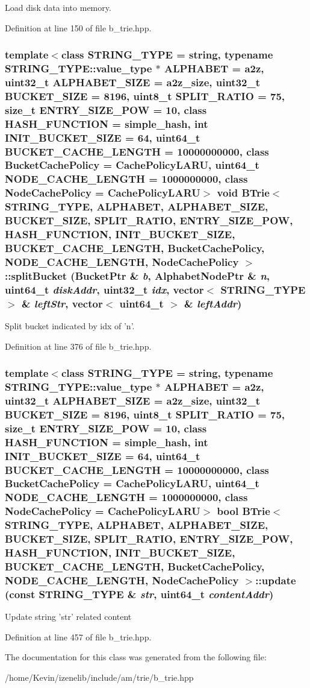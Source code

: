 Load disk data into memory. 

Definition at line 150 of file b\_\-trie.hpp.\hypertarget{classBTrie_3e3f5765235c78ab56663a0852c1178d}{
\subsubsection[{splitBucket}]{\setlength{\rightskip}{0pt plus 5cm}template$<$class STRING\_\-TYPE  = string, typename STRING\_\-TYPE::value\_\-type $\ast$ ALPHABET = a2z, uint32\_\-t ALPHABET\_\-SIZE = a2z\_\-size, uint32\_\-t BUCKET\_\-SIZE = 8196, uint8\_\-t SPLIT\_\-RATIO = 75, size\_\-t ENTRY\_\-SIZE\_\-POW = 10, class HASH\_\-FUNCTION  = simple\_\-hash, int INIT\_\-BUCKET\_\-SIZE = 64, uint64\_\-t BUCKET\_\-CACHE\_\-LENGTH = 10000000000, class BucketCachePolicy  = CachePolicyLARU, uint64\_\-t NODE\_\-CACHE\_\-LENGTH = 1000000000, class NodeCachePolicy  = CachePolicyLARU$>$ void {\bf BTrie}$<$ STRING\_\-TYPE, ALPHABET, ALPHABET\_\-SIZE, BUCKET\_\-SIZE, SPLIT\_\-RATIO, ENTRY\_\-SIZE\_\-POW, HASH\_\-FUNCTION, INIT\_\-BUCKET\_\-SIZE, BUCKET\_\-CACHE\_\-LENGTH, BucketCachePolicy, NODE\_\-CACHE\_\-LENGTH, NodeCachePolicy $>$::splitBucket (BucketPtr \& {\em b}, \/  AlphabetNodePtr \& {\em n}, \/  uint64\_\-t {\em diskAddr}, \/  uint32\_\-t {\em idx}, \/  vector$<$ STRING\_\-TYPE $>$ \& {\em leftStr}, \/  vector$<$ uint64\_\-t $>$ \& {\em leftAddr})}}
\label{classBTrie_3e3f5765235c78ab56663a0852c1178d}


Split bucket indicated by idx of 'n'. 

Definition at line 376 of file b\_\-trie.hpp.\hypertarget{classBTrie_7557a9c4d0eb728ca0bcbd417d922f17}{
\subsubsection[{update}]{\setlength{\rightskip}{0pt plus 5cm}template$<$class STRING\_\-TYPE  = string, typename STRING\_\-TYPE::value\_\-type $\ast$ ALPHABET = a2z, uint32\_\-t ALPHABET\_\-SIZE = a2z\_\-size, uint32\_\-t BUCKET\_\-SIZE = 8196, uint8\_\-t SPLIT\_\-RATIO = 75, size\_\-t ENTRY\_\-SIZE\_\-POW = 10, class HASH\_\-FUNCTION  = simple\_\-hash, int INIT\_\-BUCKET\_\-SIZE = 64, uint64\_\-t BUCKET\_\-CACHE\_\-LENGTH = 10000000000, class BucketCachePolicy  = CachePolicyLARU, uint64\_\-t NODE\_\-CACHE\_\-LENGTH = 1000000000, class NodeCachePolicy  = CachePolicyLARU$>$ bool {\bf BTrie}$<$ STRING\_\-TYPE, ALPHABET, ALPHABET\_\-SIZE, BUCKET\_\-SIZE, SPLIT\_\-RATIO, ENTRY\_\-SIZE\_\-POW, HASH\_\-FUNCTION, INIT\_\-BUCKET\_\-SIZE, BUCKET\_\-CACHE\_\-LENGTH, BucketCachePolicy, NODE\_\-CACHE\_\-LENGTH, NodeCachePolicy $>$::update (const STRING\_\-TYPE \& {\em str}, \/  uint64\_\-t {\em contentAddr})}}
\label{classBTrie_7557a9c4d0eb728ca0bcbd417d922f17}


Update string 'str' related content 

Definition at line 457 of file b\_\-trie.hpp.

The documentation for this class was generated from the following file:\begin{CompactItemize}
\item 
/home/Kevin/izenelib/include/am/trie/b\_\-trie.hpp\end{CompactItemize}
